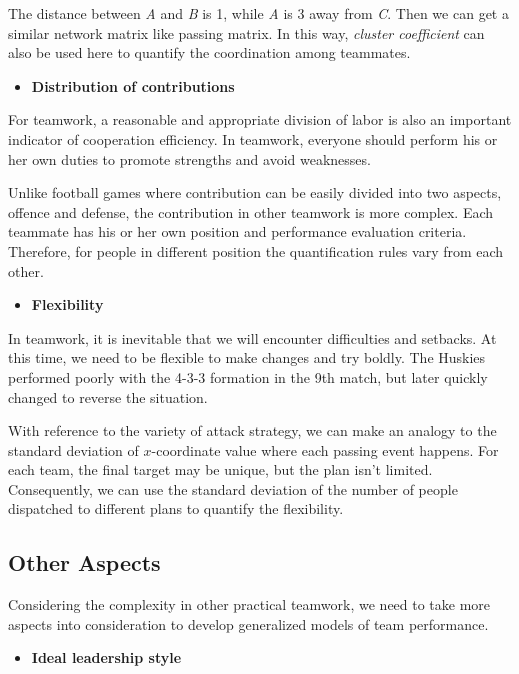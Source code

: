 \documentclass[12pt]{article}  %
\begin{document}
The distance between \textit{A} and \textit{B} is 1, while \textit{A} is 3 away from \textit{C}. Then we can get a similar network matrix like passing matrix. In this way, \textit{cluster coefficient} can also be used here to quantify the coordination among teammates. 


\begin{itemize}
    \item \textbf{Distribution of contributions}
\end{itemize}

For teamwork, a reasonable and appropriate division of labor is also an important indicator of cooperation efficiency. In teamwork, everyone should perform his or her own duties to promote strengths and avoid weaknesses.

Unlike football games where contribution can be easily divided into two aspects, offence and defense, the contribution in other teamwork is more complex. Each teammate has his or her own position and performance evaluation criteria. Therefore, for people in different position the quantification rules vary from each other. 

\vspace{4pt}
\begin{itemize}
    \item \textbf{Flexibility}
\end{itemize}

In teamwork, it is inevitable that we will encounter difficulties and setbacks. At this time, we need to be flexible to make changes and try boldly. The Huskies performed poorly with the \textsf{4-3-3} formation in the 9th match, but later quickly changed to reverse the situation. 

With reference to the variety of attack strategy, we can make an analogy to the standard deviation of $x$-coordinate value where each passing event happens. For each team, the final target may be unique, but the plan isn't limited. Consequently, we can use the standard deviation of the number of people dispatched to different plans to quantify the flexibility. 


\subsection{Other Aspects}\label{sec7.2}
Considering the complexity in other practical teamwork, we need to take more aspects into consideration to develop generalized models of team performance. 

\begin{itemize}
    \item \textbf{Ideal leadership style}
\end{itemize}
\end{document}
